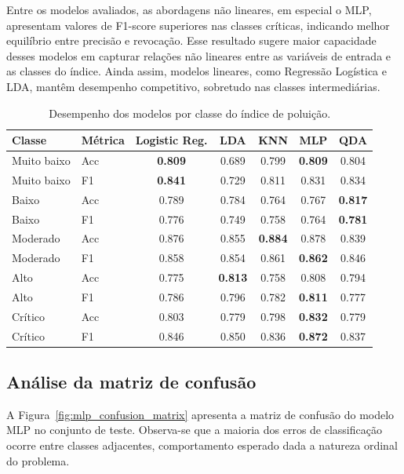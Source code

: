 Entre os modelos avaliados, as abordagens não lineares, em especial o MLP, apresentam valores de F1-score superiores nas classes críticas, indicando melhor equilíbrio entre precisão e revocação. Esse resultado sugere maior capacidade desses modelos em capturar relações não lineares entre as variáveis de entrada e as classes do índice. Ainda assim, modelos lineares, como Regressão Logística e LDA, mantêm desempenho competitivo, sobretudo nas classes intermediárias.
\begin{table}[ht]
\centering
\caption{Desempenho dos modelos por classe do índice de poluição.}
\label{tab:performance_nivel}
\begin{tabular}{l l c c c c c}
\toprule
Classe & Métrica & Logistic Reg. & LDA & KNN & MLP & QDA \\
\midrule
Muito baixo & Acc & \textbf{0.809} & 0.689 & 0.799 & \textbf{0.809} & 0.804 \\
Muito baixo & F1  & \textbf{0.841} & 0.729 & 0.811 & 0.831 & 0.834 \\
\midrule
Baixo & Acc & 0.789 & 0.784 & 0.764 & 0.767 & \textbf{0.817} \\
Baixo & F1  & 0.776 & 0.749 & 0.758 & 0.764 & \textbf{0.781} \\
\midrule
Moderado & Acc & 0.876 & 0.855 & \textbf{0.884} & 0.878 & 0.839 \\
Moderado & F1  & 0.858 & 0.854 & 0.861 & \textbf{0.862} & 0.846 \\
\midrule
Alto & Acc & 0.775 & \textbf{0.813} & 0.758 & 0.808 & 0.794 \\
Alto & F1  & 0.786 & 0.796 & 0.782 & \textbf{0.811} & 0.777 \\
\midrule
Crítico & Acc & 0.803 & 0.779 & 0.798 & \textbf{0.832} & 0.779 \\
Crítico & F1  & 0.846 & 0.850 & 0.836 & \textbf{0.872} & 0.837 \\
\bottomrule
\end{tabular}
\end{table}

\subsection{Análise da matriz de confusão}
\label{subsec:confusao}

A Figura~\ref{fig:mlp_confusion_matrix} apresenta a matriz de confusão do modelo MLP no conjunto de teste. Observa-se que a maioria dos erros de classificação ocorre entre classes adjacentes, comportamento esperado dada a natureza ordinal do problema.

